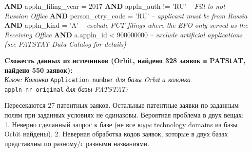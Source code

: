 \documentclass[11pt]{article}
\newenvironment{Shaded}{}{}
\newcommand{\KeywordTok}[1]{\textcolor[rgb]{0.00,0.44,0.13}{\textbf{{#1}}}}
\newcommand{\DecValTok}[1]{\textcolor[rgb]{0.25,0.63,0.44}{{#1}}}
\newcommand{\StringTok}[1]{\textcolor[rgb]{0.25,0.44,0.63}{{#1}}}
\newcommand{\CommentTok}[1]{\textcolor[rgb]{0.38,0.63,0.69}{\textit{{#1}}}}
\newcommand{\NormalTok}[1]{{#1}}
\begin{document}
\begin{Shaded}
\begin{Highlighting}[]
\KeywordTok{AND}\NormalTok{ appln_filing_year = }\DecValTok{2017}
\KeywordTok{AND}\NormalTok{ appln_auth != }\StringTok{'RU'} \CommentTok{-- Fill to not Russian Office}
\KeywordTok{AND}\NormalTok{ person_ctry_code = }\StringTok{'RU'}  \CommentTok{-- applicant must be from Russia}
\KeywordTok{AND}\NormalTok{ appln_kind = }\StringTok{'A'}  \CommentTok{-- exclude PCT filings where the EPO only served as the Receiving Office}
\KeywordTok{AND}\NormalTok{ a.appln_id < }\DecValTok{900000000}   \CommentTok{-- exclude artificial applications (see PATSTAT Data Catalog for details)}
\end{Highlighting}
\end{Shaded}

\textbf{Cхожесть данных из источников (Orbit, найдено 328 заявок и
PATStAT, найдено 550 заявок):}\\
\emph{Ключ: Колонка} \texttt{Application\ number} \emph{для базы Orbit и
колонка} \texttt{appln\_nr\_original} \emph{для базы PATSTAT:}

Пересекаются \(27\) патентных заяков. Остальные патентные заявки по
заданным полям при заданных условиях не одинаковы. Вероятная проблема в
двух вещах: 1. Неверно сделанный запрос к базе (не все коды technology
domains из базы Orbit найдены). 2. Неверная обработка кодов заявок,
которые в двух базах представлны по разному/с разными названиями.


    
    
    
    
\end{document}
